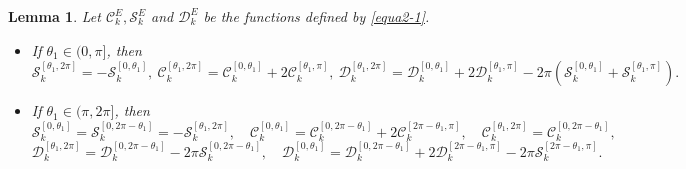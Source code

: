 \documentclass[10pt,a4paper]{amsart}
\newtheorem{lem}{Lemma}
\begin{document}
\begin{lem} \label{lemforSCD} Let  $\mathcal{C}_{k}^{E}, \mathcal{S}_{k}^{E}$ and $\mathcal{D}_{k}^{E}$ be the functions defined by  \eqref{equa2-1}.
\begin{itemize}

\item[(i)] If  $\theta_1\in(0,\pi]$, then \begin{equation*}
\label{relaofscd-1}\mathcal{S}_{k}^{\left[\theta_{1},2\pi\right]}
=-\mathcal{S}_{k}^{\left[0,\theta_{1}\right]},\
\mathcal{C}_{k}^{\left[\theta_{1},2\pi\right]}
=\mathcal{C}_{k}^{\left[0,\theta_{1}\right]}+2\mathcal{C}_{k}^{\left[\theta_{1},\pi\right]},\
\mathcal{D}_{k}^{\left[\theta_{1},2\pi\right]}
=\mathcal{D}_{k}^{\left[0,\theta_{1}\right]}+2\mathcal{D}_{k}^{\left[\theta_{1},\pi\right]}-2\pi\left(\mathcal{S}_{k}^{\left[0,\theta_{1}\right]}+\mathcal{S}_{k}^{\left[\theta_{1},\pi\right]}\right).\end{equation*}

\item[(ii)]  If $\theta_1\in(\pi, 2\pi]$, then
\begin{equation*}\label{relaofscd-2}
 \mathcal{S}_{k}^{\left[0,\theta_{1}\right]}=\mathcal{S}_{k}^{\left[0,2\pi-\theta_{1}\right]}=-\mathcal{S}_{k}^{\left[\theta_{1},2\pi\right]},\quad
\mathcal{C}_{k}^{\left[0,\theta_{1}\right]}
=\mathcal{C}_{k}^{\left[0,2\pi-\theta_{1}\right]}+2\mathcal{C}_{k}^{\left[2\pi-\theta_{1},\pi\right]},\quad
\mathcal{C}_{k}^{\left[\theta_{1},2\pi\right]}
=\mathcal{C}_{k}^{\left[0,2\pi-\theta_1\right]},
\end{equation*}
\begin{equation*}\label{relaofscd-2-1}
 \mathcal{D}_{k}^{\left[\theta_{1},2\pi\right]}=\mathcal{D}_{k}^{\left[0, 2\pi-\theta_{1}\right]}-2\pi\mathcal{S}_{k}^{\left[0, 2\pi-\theta_{1}\right]},\quad
 \mathcal{D}_{k}^{\left[0, \theta_{1}\right]}=\mathcal{D}_{k}^{\left[0, 2\pi-\theta_{1}\right]}+2\mathcal{D}_{k}^{\left[ 2\pi-\theta_{1}, \pi\right]}-2\pi\mathcal{S}_{k}^{\left[ 2\pi-\theta_{1}, \pi\right]}.
\end{equation*}
\end{itemize}
\end{lem}
\end{document}
